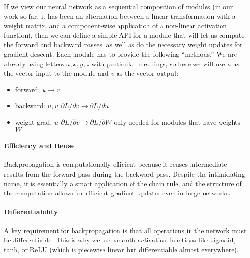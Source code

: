 \documentclass[11pt]{article}
\begin{document}
If we view our neural network as a sequential composition of modules
(in our work so far, it has been an alternation between a linear
transformation with a weight matrix, and a component-wise application
of a non-linear activation function), then we can define a simple API
for a module that will let us compute the forward and backward passes,
as well as do the necessary weight updates for gradient descent.  Each
module has to provide the following ``methods.''  We are already using
letters $a, x, y, z$ with particular meanings, so here we will use $u$
as the vector input to the module and $v$ as the vector output:
\begin{itemize}
  \item forward: $u \rightarrow v$
  \item backward: $u, v, \partial L /
    \partial v \rightarrow \partial L / \partial u$
  \item weight grad: $u, \partial L / \partial v \rightarrow \partial L
    / \partial W$  only needed for modules that have weights $W$
\end{itemize}


\paragraph{Efficiency and Reuse}

Backpropagation is computationally efficient because it reuses intermediate results from the forward pass during the backward pass. Despite the intimidating name, it is essentially a smart application of the chain rule, and the structure of the computation allows for efficient gradient updates even in large networks.

\paragraph{Differentiability}

A key requirement for backpropagation is that all operations in the network must be differentiable. This is why we use smooth activation functions like sigmoid, tanh, or ReLU (which is piecewise linear but differentiable almost everywhere).
\end{document}

